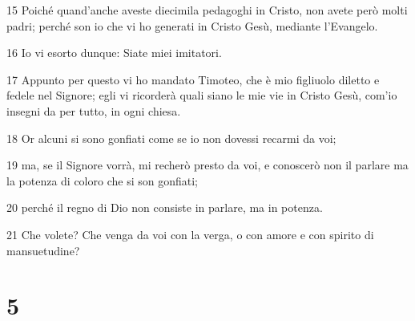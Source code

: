 \par 15 Poiché quand'anche aveste diecimila pedagoghi in Cristo, non avete però molti padri; perché son io che vi ho generati in Cristo Gesù, mediante l'Evangelo.
\par 16 Io vi esorto dunque: Siate miei imitatori.
\par 17 Appunto per questo vi ho mandato Timoteo, che è mio figliuolo diletto e fedele nel Signore; egli vi ricorderà quali siano le mie vie in Cristo Gesù, com'io insegni da per tutto, in ogni chiesa.
\par 18 Or alcuni si sono gonfiati come se io non dovessi recarmi da voi;
\par 19 ma, se il Signore vorrà, mi recherò presto da voi, e conoscerò non il parlare ma la potenza di coloro che si son gonfiati;
\par 20 perché il regno di Dio non consiste in parlare, ma in potenza.
\par 21 Che volete? Che venga da voi con la verga, o con amore e con spirito di mansuetudine?

\chapter{5}

